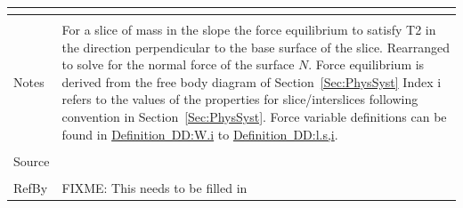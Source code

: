 \documentclass[12pt]{article}
\begin{document}
\begin{minipage}{\textwidth}
\begin{tabular}{p{} p{}}
\begin{symbDescription}
              \end{symbDescription}
\\ \midrule \\
Notes & For a slice of mass in the slope the force equilibrium to satisfy T2 in the direction perpendicular to the base surface of the slice. Rearranged to solve for the normal force of the surface $N$. Force equilibrium is derived from the free body diagram of Section~\ref{Sec:PhysSyst} Index i refers to the values of the properties for slice/interslices following convention in Section~\ref{Sec:PhysSyst}. Force variable definitions can be found in \hyperref[DD:W.i]{Definition~DD:W.i} to \hyperref[DD:l.s,i]{Definition~DD:l.s,i}.
\\ \midrule \\
Source &
\\ \midrule \\
RefBy & FIXME: This needs to be filled in
\\ \bottomrule \end{tabular}
\end{minipage}\\
~\newline
\end{document}
